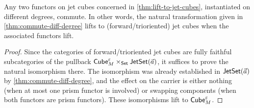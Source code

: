 \documentclass[a4paper]{article}
\begin{document}
%	
\begin{proposition} \label{thm:cube-commute-diff-degree}
	Any two functors on jet cubes concerned in \cref{thm:lift-to-jet-cubes}, instantiated on different degrees, commute.
	In other words, the natural transformation given in \cref{thm:commute-diff-degree} lifts to (forward/trioriented) jet cubes when the associated functors lift.
\end{proposition}
\begin{proof}
	Since the categories of forward/trioriented jet cubes are fully faithful subcategories of the pullback ${\mathsf{Cube}}_M^\varepsilon \times_{\mathsf{Set}} \mathsf{JetSet}(\vec a)$, it suffices to prove the natural isomorphism there.
	The isomorphism was already established in $\mathsf{JetSet}(\vec a)$ by \cref{thm:commute-diff-degree}, and the effect on the carrier is either nothing (when at most one prism functor is involved) or swapping components (when both functors are prism functors).
	These isomorphisms lift to ${\mathsf{Cube}}_M^\varepsilon$.
\end{proof}
\end{document}
